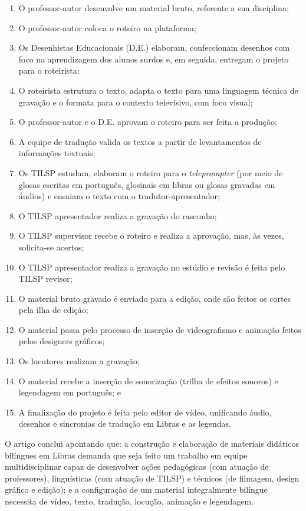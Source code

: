 \documentclass[portuguese]{textolivre}
\begin{document}
\begin{enumerate}
    \item O professor-autor desenvolve um material bruto, referente a sua disciplina; 
    \item O professor-autor coloca o roteiro na plataforma; 
    \item Os Desenhistas Educacionais (D.E.) elaboram, confeccionam desenhos com foco na aprendizagem dos alunos surdos e, em seguida, entregam o projeto para o roteirista; 
    \item O roteirista estrutura o texto, adapta o texto para uma linguagem técnica de gravação e o formata para o contexto televisivo, com foco visual; 
    \item O professor-autor e o D.E. aprovam o roteiro para ser feita a produção; 
    \item A equipe de tradução valida os textos a partir de levantamentos de informações textuais; 
    \item Os TILSP estudam, elaboram o roteiro para o \textit{teleprompter} (por meio de glosas escritas em português, glosinais em libras ou glosas gravadas em áudios) e ensaiam o texto com o tradutor-apresentador; 
    \item O TILSP apresentador realiza a gravação do rascunho; 
    \item O TILSP supervisor recebe o roteiro e realiza a aprovação, mas, às vezes, solicita-se acertos; 
    \item O TILSP apresentador realiza a gravação no estúdio e revisão é feita pelo TILSP revisor; 
    \item O material bruto gravado é enviado para a edição, onde são feitos os cortes pela ilha de edição; 
    \item O material passa pelo processo de inserção de videografismo e animação feitos pelos designers gráficos; 
    \item Os locutores realizam a gravação; 
    \item O material recebe a inserção de sonorização (trilha de efeitos sonoros) e legendagem em português; e
    \item A finalização do projeto é feita pelo editor de vídeo, unificando áudio, desenhos e sincronias de tradução em Libras e as legendas. 
\end{enumerate}

O artigo conclui apontando que: a construção e elaboração de materiais didáticos bilíngues em Libras demanda que seja feito um trabalho em equipe multidisciplinar capaz de desenvolver ações pedagógicas (com atuação de professores), linguísticas (com atuação de TILSP) e técnicos (de filmagem, design gráfico e edição); e a configuração de um material integralmente bilíngue necessita de vídeo, texto, tradução, locução, animação e legendagem.
\end{document}
